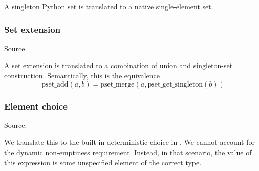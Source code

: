 \begin{mathpar}
\end{mathpar}
A singleton Python set is translated to a \tlap{} native single-element set.

\subsubsection{Set extension}
\href{https://github.com/saltiniroberto/ssf/blob/7ea6e18093d9da3154b4e396dd435549f687e6b9/high_level/common/pythonic_code_generic.py#L54-L55}{Source}.



\begin{mathpar}
\end{mathpar}
A set extension is translated to a combination of union and singleton-set construction. Semantically, this is the equivalence
\[
\mathrm{pset\_add}(a,b) = \mathrm{pset\_merge}(a, \mathrm{pset\_get\_singleton}(b))
\]

\subsubsection{Element choice}
\href{https://github.com/saltiniroberto/ssf/blob/7ea6e18093d9da3154b4e396dd435549f687e6b9/high_level/common/pythonic_code_generic.py#L58-L60}{Source.}



\begin{mathpar}
\end{mathpar}
We translate this to the built in deterministic choice in \tlap{}. We cannot account for the dynamic non-emptiness requirement. Instead, in that scenario, the value of this expression is some unspecified element of the correct type.

